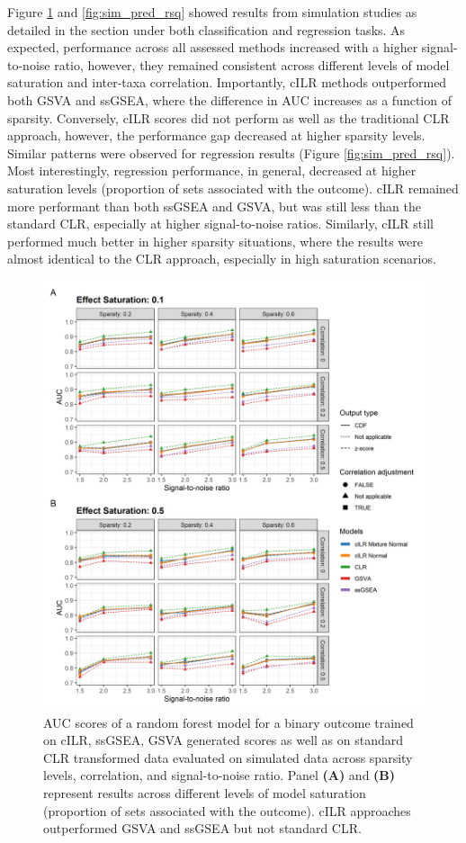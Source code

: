 \documentclass{article}
\begin{document}
Figure \ref{fig:sim_pred_auc} and \ref{fig:sim_pred_rsq} showed results from simulation studies as detailed in the  section under both classification and regression tasks. As expected, performance across all assessed methods increased with a higher signal-to-noise ratio, however, they remained consistent across different levels of model saturation and inter-taxa correlation. Importantly, cILR methods outperformed both GSVA and ssGSEA, where the difference in AUC increases as a function of sparsity. Conversely, cILR scores did not perform as well as the traditional CLR approach, however, the performance gap decreased at higher sparsity levels. Similar patterns were observed for regression results (Figure \ref{fig:sim_pred_rsq}). Most interestingly, regression performance, in general, decreased at higher saturation levels (proportion of sets associated with the outcome). cILR remained more performant than both ssGSEA and GSVA, but was still less than the standard CLR, especially at higher signal-to-noise ratios. Similarly, cILR still performed much better in higher sparsity situations, where the results were almost identical to the CLR approach, especially in high saturation scenarios.     

\begin{figure}[H]
    \centering
    \includegraphics[width=\textwidth]{figures/sim_pred_auc.png}
    \caption{AUC scores of a random forest model for a binary outcome trained on cILR, ssGSEA, GSVA generated scores as well as on standard CLR transformed data evaluated on simulated data across sparsity levels, correlation, and signal-to-noise ratio. Panel \textbf{(A)} and \textbf{(B)} represent results across different levels of model saturation (proportion of sets associated with the outcome). cILR approaches outperformed GSVA and ssGSEA but not standard CLR.}
    \label{fig:sim_pred_auc}
\end{figure}
\end{document}
